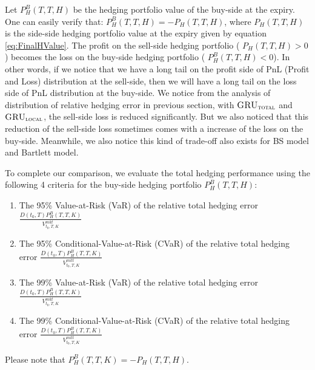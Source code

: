 \documentclass[letterpaper,12pt,titlepage,oneside,final]{book}
\numberwithin{equation}{section}
\theoremstyle{definition}
\newcommand{\modelT}{\textsc{GRU}_{\textsc{total}}}
\newcommand{\modelL}{\textsc{GRU}_{\textsc{local}}}
\newcommand{\Vmkt}{V^{mkt}}
\begin{document}
Let $P^{B}_H(T,T,H)$ be the hedging portfolio value of the buy-side at the expiry. One can easily verify that:
$P^{B}_H(T,T,H)=-P_H(T,T,H)$, where $P_H(T,T,H)$ is the side-side  hedging portfolio value at the expiry given by equation \eqref{eq:FinalHValue}. The profit  on the sell-side  hedging portfolio ( $P_H(T,T,H)>0$) becomes the loss on the  buy-side hedging portfolio ( $P^B_H(T,T,H)<0$). In other words, if we notice that we have a long tail on the profit side of PnL (Profit and Loss) distribution at the sell-side, then we will have a long tail on the loss side of PnL distribution at the buy-side. We notice from the analysis of distribution of relative hedging error in previous section, with $\modelT$ and $\modelL$, the sell-side loss is reduced significantly. But we also noticed that this reduction of the sell-side loss sometimes comes with a increase of the loss on the buy-side. Meanwhile, we also notice this kind of trade-off also exists for BS model and Bartlett model.

To complete our comparison, we evaluate the total hedging performance using the following 4 criteria for the buy-side hedging portfolio $P^{B}_H(T,T,H)$:
\begin{enumerate}

	\item The 95\% Value-at-Risk (VaR) of the relative total hedging error $\frac{D(t_0,T) P^B_H(T,T,K)}{\Vmkt_{t_0,T,K}}$
	\item The 95\% Conditional-Value-at-Risk (CVaR) of the relative total hedging error $\frac{D(t_0,T) P^B_H(T,T,K)}{\Vmkt_{t_0,T,K}}$
	\item The 99\% Value-at-Risk (VaR) of the relative total hedging error $\frac{D(t_0,T) P^B_H(T,T,K)}{\Vmkt_{t_0,T,K}}$
	\item The 99\% Conditional-Value-at-Risk (CVaR) of the relative total hedging error $\frac{D(t_0,T) P^B_H(T,T,K)}{\Vmkt_{t_0,T,K}}$
\end{enumerate}
Please note that $P^B_H(T,T,K)=-P_H(T,T,H)$.
\end{document}
